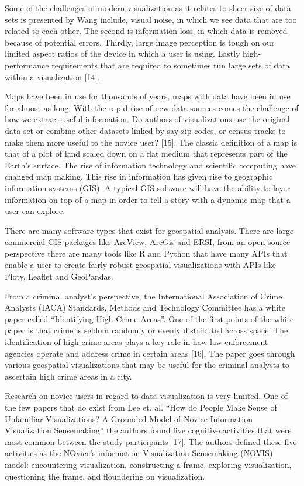 \documentclass[runningheads]{llncs}
\begin{document}
Some of the challenges of modern visualization as it relates to sheer size of data sets is presented by Wang include, visual noise, in which we see data that are too related to each other. The second is information loss, in which data is removed because of potential errors. Thirdly, large image perception is tough on our limited aspect ratios of the device in which a user is using. Lastly high-performance requirements that are required to sometimes run large sets of data within a visualization [14].

Maps have been in use for thousands of years, maps with data have been in use for almost as long. With the rapid rise of new data sources comes the challenge of how we extract useful information. Do authors of visualizations use the original data set or combine other datasets linked by say zip codes, or census tracks to make them more useful to the novice user? [15]. The classic definition of a map is that of a plot of land scaled down on a flat medium that represents part of the Earth’s surface. The rise of information technology and scientific computing have changed map making. This rise in information has given rise to geographic information systems (GIS). A typical GIS software will have the ability to layer information on top of a map in order to tell a story with a dynamic map that a user can explore. 

There are many software types that exist for geospatial analysis. There are large commercial GIS packages like ArcView, ArcGis and ERSI, from an open source perspective there are many tools like R and Python that have many APIs that enable a user to create fairly robust geospatial visualizations with APIs like Ploty, Leaflet and GeoPandas.

From a criminal analyst’s perspective, the International Association of Crime Analysts (IACA) Standards, Methods and Technology Committee has a white paper called “Identifying High Crime Areas”. One of the first points of the white paper is that crime is seldom randomly or evenly distributed across space. The identification of high crime areas plays a key role in how law enforcement agencies operate and address crime in certain areas [16]. The paper goes through various geospatial visualizations that may be useful for the criminal analysts to ascertain high crime areas in a city.

Research on novice users in regard to data visualization is very limited. One of the few papers that do exist from Lee et. al. “How do People Make Sense of Unfamiliar Visualizations? A Grounded Model of Novice Information Visualization Sensemaking” the authors found five cognitive activities that were most common between the study participants [17]. The authors defined these five activities as the NOvice's information Visualization Sensemaking (NOVIS) model: encountering visualization, constructing a frame, exploring visualization, questioning the frame, and floundering on visualization. 
\end{document}
